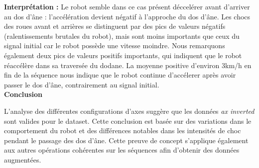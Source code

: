 \textbf{Interprétation :} 
Le robot semble dans ce cas présent déccelérer avant d'arriver au dos d'âne : l'accélération devient négatif à l'approche du dos d'âne. Les chocs des roues avant et arrières se distinguent par des pics de valeurs négatifs (ralentissements brutales du robot), mais sont moins importants que ceux du signal initial car le robot possède une vitesse moindre. Nous remarquons également deux pics de valeurs positifs importants, qui indiquent que le robot réaccélère dans sa traversée du dodane. La moyenne positive d'environ 3km/h en fin de la séquence nous indique que le robot continue d'accélerer après avoir passer le dos d'âne, contrairement au signal initial.\\


\noindent \textbf{Conclusion}

\noindent L'analyse des différentes configurations d'axes suggère que les données \textit{ax inverted} sont valides pour le dataset. Cette conclusion est basée sur des variations dans le comportement du robot et des différences notables dans les intensités de choc pendant le passage des dos d'âne. Cette preuve de concept s'applique également aux autres opérations cohérentes sur les séquences afin d'obtenir des données augmentées.
